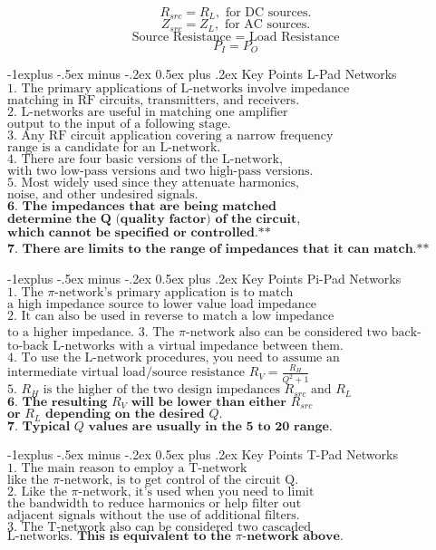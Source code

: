 \documentclass[10pt,landscape]{article}
\makeatletter
\renewcommand{\subsection}{\@startsection{subsection}{2}{0mm}%
                                {-1explus -.5ex minus -.2ex}%
                                {0.5ex plus .2ex}%
                                {\normalfont\normalsize\bfseries}}
\makeatother
\begin{document}
\begin{multicols}{3}
$$R_{src} = R_L, \text{ for DC sources.}$$
$$Z_{src} = Z_L, \text{ for AC sources.}$$
$$\text{Source Resistance = Load Resistance}$$
$$P_I = P_O$$  

\subsection{Key Points L-Pad Networks}  
$\text{1. The primary applications of L-networks involve impedance}$
$\text{matching in RF circuits, transmitters, and receivers.}$  
$\text{2. L-networks are useful in matching one amplifier}$
$\text{output to the input of a following stage.}$  
$\text{3. Any RF circuit application covering a narrow frequency}$  
$\text{range is a candidate for an L-network.}$  
$\text{4. There are four basic versions of the L-network,}$
$\text{with two low-pass versions and two high-pass versions.}$
$\text{5. Most widely used since they attenuate harmonics,}$
$\text{noise, and other undesired signals.}$
$\textbf{6. The impedances that are being matched}$
$\textbf{determine the Q (quality factor) of the circuit,}$
$\textbf{which cannot be specified or controlled.**}$
$\textbf{7. There are limits to the range of impedances}$
$\textbf{that it can match.**}$

\subsection{Key Points Pi-Pad Networks}  
$\text{1. The }\pi\text{-network’s primary application is to match}$
$\text{a high impedance source to lower value load impedance}$  
$\text{2. It can also be used in reverse to match a low impedance}$
$\text{to a higher impedance.}$  
$\text{3. The }\pi\text{-network also can be considered two back-}$  
$\text{to-back L-networks with a virtual impedance between them.}$  
$\text{4. To use the L-network procedures, you need to assume an}$
$\text{intermediate virtual load/source resistance } R_V = \frac{R_H}{Q^2 + 1}$
$\text{5. $R_H$ is the higher of the two design impedances } R_{src} \text{ and } R_L$
$\textbf{6. The resulting } R_V \textbf{ will be lower than either } R_{src}$
$\textbf{or } R_L \textbf{ depending on the desired } Q.$
$\textbf{7. Typical }Q \textbf{ values are usually in the 5 to 20 range.}$

\subsection{Key Points T-Pad Networks}  
$\text{1. The main reason to employ a T-network}$
$\text{like the }\pi \text{-network, is to get control of the circuit Q.}$  
$\text{2. Like the }\pi \text{-network, it's used when you need to limit}$
$\text{the bandwidth to reduce harmonics or help filter out}$
$\text{adjacent signals without the use of additional filters.}$   
$\text{3. The T-network also can be considered two cascaded}$  
$\text{L-networks. }\textbf{This is equivalent to the }\pi\textbf{-network above.}$  



\end{multicols}
\end{document}
